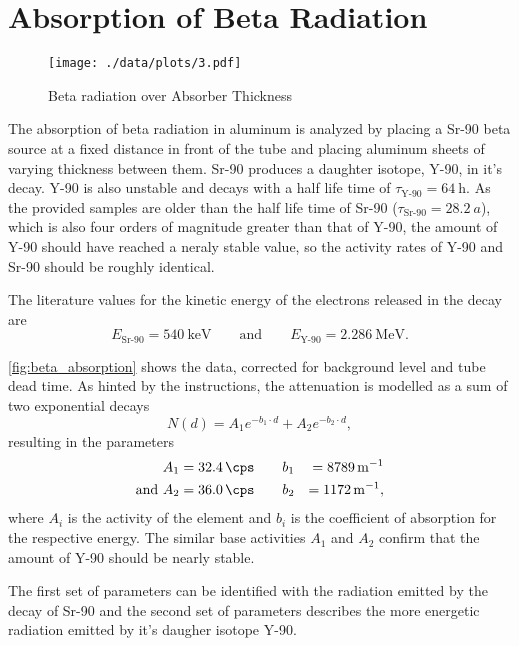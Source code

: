 \chapter{Absorption of Beta Radiation}

\begin{figure}[ht!]
	\centering
	\texttt{[image: ./data/plots/3.pdf]}
	\caption{Beta radiation over Absorber Thickness}
	\label{fig:beta_absorption}
\end{figure}

The absorption of beta radiation in aluminum is analyzed by placing a Sr-90 beta source at a fixed distance in front of the tube and placing aluminum sheets of varying thickness between them.
Sr-90 produces a daughter isotope, Y-90, in it's decay. Y-90 is also unstable and decays with a half life time of $\tau_\text{Y-90} = \SI{64}{\hour}$.
As the provided samples are older than the half life time of Sr-90 ($\tau_\text{Sr-90} = \SI{28.2}{a}$), which is also four orders of magnitude greater than that of Y-90, the amount of Y-90 should have reached a neraly stable value, so the activity rates of Y-90 and Sr-90 should be roughly identical.

The literature values for the kinetic energy of the electrons released in the decay are
\begin{equation*}
	E_\text{Sr-90} = \SI{540}{\keV} \qquad \text{and} \qquad E_\text{Y-90} = \SI{2.286}{\MeV}.
\end{equation*}

\autoref{fig:beta_absorption} shows the data, corrected for background level and tube dead time.
As hinted by the instructions, the attenuation is modelled as a sum of two exponential decays
\begin{equation*}
	N(d) = A_1 e^{-b_1 \cdot d} + A_2 e^{-b_2 \cdot d},
\end{equation*}
resulting in the parameters
\begin{alignat*}{2}
	A_1 &= \SI{32.4}{\cps} \qquad b_1 &= \SI{8789}{\meter^{-1}}\\
	\text{and } A_2 &= \SI{36.0}{\cps} \qquad b_2 &= \SI{1172}{\meter^{-1}},
\end{alignat*}
where $A_i$ is the activity of the element and $b_i$ is the coefficient of absorption for the respective energy.
The similar base activities $A_1$ and $A_2$ confirm that the amount of Y-90 should be nearly stable.

The first set of parameters can be identified with the radiation emitted by the decay of Sr-90 and the second set of parameters describes the more energetic radiation emitted by it's daugher isotope Y-90.

